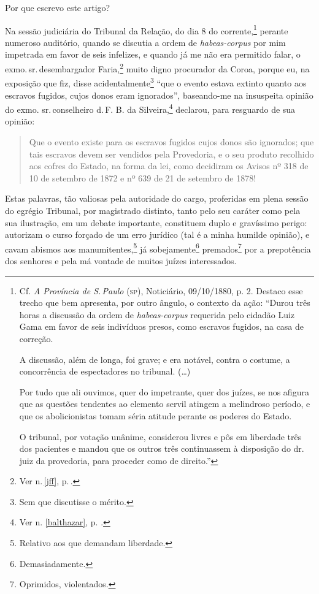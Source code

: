 {\asterisc

Por que escrevo este artigo?

Na sessão judiciária do Tribunal da Relação, do dia 8 do
corrente,\footnote{Cf. \emph{A Província de S.\,Paulo} (\textsc{sp}), Noticiário,
  09/10/1880, p. 2. Destaco esse trecho que bem apresenta, por outro
  ângulo, o contexto da ação: ``Durou três horas a discussão da ordem de
  \emph{habeas-corpus} requerida pelo cidadão Luiz Gama em favor de seis
  indivíduos presos, como escravos fugidos, na casa de correção.

  A discussão, além de longa, foi grave; e era notável, contra o
  costume, a concorrência de espectadores no tribunal. (\ldots{})

  Por tudo que ali ouvimos, quer do impetrante, quer dos juízes, se nos
  afigura que as questões tendentes ao elemento servil atingem a
  melindroso período, e que os abolicionistas tomam séria atitude
  perante os poderes do Estado.

  O tribunal, por votação unânime, considerou livres e pôs em liberdade
  três dos pacientes e mandou que os outros três continuassem à
  disposição do dr.\,juiz da provedoria, para proceder como de direito.''}
perante numeroso auditório, quando se discutia a ordem de
\emph{habeas-corpus} por mim impetrada em favor de seis infelizes, e
quando já me não era permitido falar, o exmo.\,sr.\,desembargador
Faria,\footnote{Ver n.\,\ref{jff}, p.\,\pageref{jff}.} muito digno procurador da Coroa, porque eu, na
exposição que fiz, disse acidentalmente\footnote{Sem que discutisse o
  mérito.} ``que o evento estava extinto quanto aos escravos fugidos,
cujos donos eram ignorados'', baseando-me na insuspeita opinião do exmo.
sr.\,conselheiro d.\,F. B. da Silveira,\footnote{Ver n. \ref{balthazar}, p. \pageref{balthazar}.} declarou, para resguardo de sua opinião:

\begin{quote}
Que o evento existe para os escravos fugidos cujos donos são ignorados;
que tais escravos devem ser vendidos pela Provedoria, e o seu produto
recolhido aos cofres do Estado, na forma da lei, como decidiram os
Avisos nº 318 de 10 de setembro de 1872 e nº 639 de 21 de setembro de
1878!
\end{quote}

Estas palavras, tão valiosas pela autoridade do cargo, proferidas em
plena sessão do egrégio Tribunal, por magistrado distinto, tanto pelo
seu caráter como pela sua ilustração, em um debate importante,
constituem duplo e gravíssimo perigo: autorizam o curso forçado de um
erro jurídico (tal é a minha humilde opinião), e cavam abismos aos
manumitentes,\footnote{Relativo aos que demandam liberdade.} já
sobejamente\footnote{Demasiadamente.} premados\footnote{Oprimidos,
  violentados.} por a
prepotência dos senhores e pela má vontade de muitos juízes
interessados.

}
